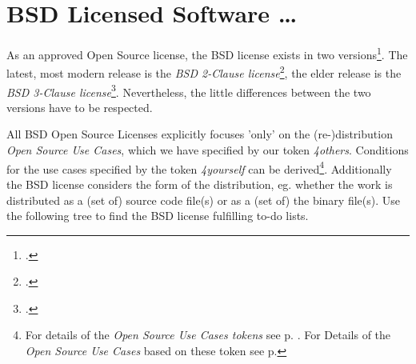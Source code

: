 %
%
%
%
%



\section{BSD Licensed Software \ldots}

As an approved Open Source license, the BSD license exists in two
versions\footcite[Following the Open Source Initiative, initially a not approved
BSD license contained a fourth clause also known as advertising clause which
\enquote{(\ldots) officially was rescinded by the Director of the Office of
Technology Licensing of the University of California on July 22nd, 1999}.
 Cf.][\nopage wp. Because of the cancellation you can simply act according the
 \textit{BSD 3-Clause license} if you have to fulfill the eldest BSD
 license]{BsdLicense3Clause}. The latest, most modern release is the \textit{BSD
 2-Clause license}\footcite[cf.][\nopage wp]{BsdLicense2Clause}, the elder
 release is the \textit{BSD 3-Clause license}\footcite[cf.][\nopage
 wp]{BsdLicense3Clause}. Nevertheless, the little differences between the
 two versions have to be respected.

All BSD Open Source Licenses explicitly focuses 'only' on the (re-)distribution
\textit{Open Source Use Cases}, which we have specified by our token
\textit{4others}. Conditions for the use cases specified by the token
\textit{4yourself} can be derived\footnote{For details of the \textit{Open
Source Use Cases tokens} see p. \pageref{OsucTokens}. For Details of the
\textit{Open Source Use Cases} based on these token see p.
\pageref{OsucDefinitionTree} }. Additionally the BSD license considers the form
of the distribution, eg. whether the work is distributed as a (set of) source
code file(s) or as a (set of) the binary file(s). Use the following tree to find
the BSD license fulfilling to-do lists.

